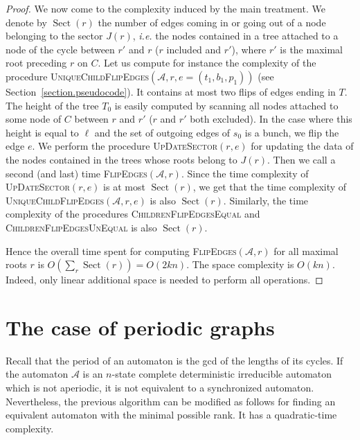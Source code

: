 \documentclass[11pt,a4paper]{article}
\newcommand{\Sect}{\operatorname{Sect}}
\def\A{\mathcal{A}}
\newcommand{\ie}{{\itshape i.e.}\xspace }
\begin{document}
\begin{proof}
  We now come to the complexity induced by the main treatment. We
  denote by $\Sect(r)$ the number of edges coming in or going out of a
  node belonging to the sector $J(r)$, \ie the nodes contained in a
  tree attached to a node of the cycle between $r'$ and $r$ ($r$
  included and $r'$), where $r'$ is the maximal root preceding $r$ on
  $C$. Let us compute for instance the complexity of the procedure
  \textsc{UniqueChildFlipEdges}$(\A,r,e=(t_1,b_1,p_1))$ (see
  Section~\ref{section.pseudocode}).  It contains at most two flips of
  edges ending in $T$.  The height of the tree $T_0$ is easily
  computed by scanning all nodes attached to some node of $C$ between
  $r$ and $r'$ ($r$ and $r'$ both excluded). In the case where this
  height is equal to $\ell$ and the set of outgoing edges of $s_0$ is
  a bunch, we flip the edge $e$.  We perform the procedure
  \textsc{UpDateSector}$(r, e)$ for updating the data of the nodes
  contained in the trees whose roots belong to $J(r)$.  Then we call
  a second (and last) time \textsc{FlipEdges}$(\A,r)$.  Since the time
  complexity of \textsc{UpDateSector}$(r, e)$ is at most $\Sect(r)$,
  we get that the time complexity of
  \textsc{UniqueChildFlipEdges}$(\A,r,e)$ is also
  $\Sect(r)$. Similarly, the time complexity of the procedures
  \textsc{ChildrenFlipEdgesEqual} and
  \textsc{ChildrenFlipEdgesUnEqual} is also $\Sect(r)$.

Hence the overall time spent for computing \textsc{FlipEdges}$(\A,r)$
for all maximal roots $r$ is $O(\sum_r \Sect(r))= O(2kn)$.
  The space complexity is $O(kn)$. Indeed, only linear
  additional space is needed to perform all operations.
\end{proof}

\section{The case of periodic graphs} \label{section.periodic}

Recall that the period of an automaton is the gcd of the lengths of
its cycles.  If the automaton $\A$ is an $n$-state
complete deterministic irreducible automaton which is not aperiodic,
it is not equivalent to a synchronized automaton. Nevertheless, the
previous algorithm can be modified as follows for finding an equivalent
automaton with the minimal possible rank. It has a quadratic-time
complexity.
\end{document}
